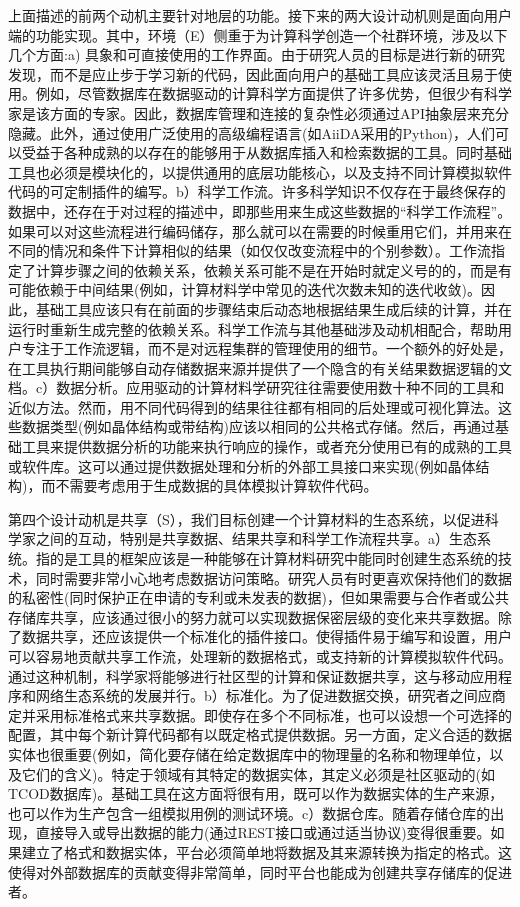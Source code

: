上面描述的前两个动机主要针对地层的功能。接下来的两大设计动机则是面向用户端的功能实现。其中，环境（E）侧重于为计算科学创造一个社群环境，涉及以下几个方面:a) 具象和可直接使用的工作界面。由于研究人员的目标是进行新的研究发现，而不是应止步于学习新的代码，因此面向用户的基础工具应该灵活且易于使用。例如，尽管数据库在数据驱动的计算科学方面提供了许多优势，但很少有科学家是该方面的专家。因此，数据库管理和连接的复杂性必须通过API抽象层来充分隐藏。此外，通过使用广泛使用的高级编程语言(如AiiDA采用的Python)，人们可以受益于各种成熟的以存在的能够用于从数据库插入和检索数据的工具。同时基础工具也必须是模块化的，以提供通用的底层功能核心，以及支持不同计算模拟软件代码的可定制插件的编写。b）科学工作流。许多科学知识不仅存在于最终保存的数据中，还存在于对过程的描述中，即那些用来生成这些数据的“科学工作流程”。如果可以对这些流程进行编码储存，那么就可以在需要的时候重用它们，并用来在不同的情况和条件下计算相似的结果（如仅仅改变流程中的个别参数）。工作流指定了计算步骤之间的依赖关系，依赖关系可能不是在开始时就定义号的的，而是有可能依赖于中间结果(例如，计算材料学中常见的迭代次数未知的迭代收敛)。因此，基础工具应该只有在前面的步骤结束后动态地根据结果生成后续的计算，并在运行时重新生成完整的依赖关系。科学工作流与其他基础涉及动机相配合，帮助用户专注于工作流逻辑，而不是对远程集群的管理使用的细节。一个额外的好处是，在工具执行期间能够自动存储数据来源并提供了一个隐含的有关结果数据逻辑的文档。c）数据分析。应用驱动的计算材料学研究往往需要使用数十种不同的工具和近似方法。然而，用不同代码得到的结果往往都有相同的后处理或可视化算法。这些数据类型(例如晶体结构或带结构)应该以相同的公共格式存储。然后，再通过基础工具来提供数据分析的功能来执行响应的操作，或者充分使用已有的成熟的工具或软件库。这可以通过提供数据处理和分析的外部工具接口来实现(例如晶体结构\cite{ong2013python})，而不需要考虑用于生成数据的具体模拟计算软件代码。

第四个设计动机是共享（S），我们目标创建一个计算材料的生态系统，以促进科学家之间的互动，特别是共享数据、结果共享和科学工作流程共享。a）生态系统。指的是工具的框架应该是一种能够在计算材料研究中能同时创建生态系统的技术，同时需要非常小心地考虑数据访问策略。研究人员有时更喜欢保持他们的数据的私密性(同时保护正在申请的专利或未发表的数据)，但如果需要与合作者或公共存储库共享，应该通过很小的努力就可以实现数据保密层级的变化来共享数据。除了数据共享，还应该提供一个标准化的插件接口。使得插件易于编写和设置，用户可以容易地贡献共享工作流，处理新的数据格式，或支持新的计算模拟软件代码。通过这种机制，科学家将能够进行社区型的计算和保证数据共享，这与移动应用程序和网络生态系统的发展并行。b）标准化。为了促进数据交换，研究者之间应商定并采用标准格式来共享数据\cite{murray2003chemical}。即使存在多个不同标准，也可以设想一个可选择的配置，其中每个新计算代码都有以既定格式提供数据。另一方面，定义合适的数据实体也很重要(例如，简化要存储在给定数据库中的物理量的名称和物理单位，以及它们的含义)。特定于领域有其特定的数据实体，其定义必须是社区驱动的(如TCOD\cite{merkys2017posteriori}数据库)。基础工具在这方面将很有用，既可以作为数据实体的生产来源，也可以作为生产包含一组模拟用例的测试环境。c）数据仓库。随着存储仓库的出现，直接导入或导出数据的能力(通过REST接口或通过适当协议)变得很重要。如果建立了格式和数据实体，平台必须简单地将数据及其来源转换为指定的格式。这使得对外部数据库的贡献变得非常简单，同时平台也能成为创建共享存储库的促进者。

